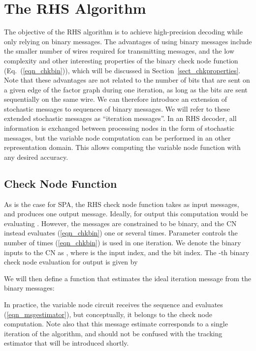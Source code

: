 \documentclass[12pt,journal,twoside,draftcls,onecolumn]{IEEEtran}
\begin{document}
\section{The RHS Algorithm}
\label{sect_algorithm}

The objective of the RHS algorithm is to achieve high-precision decoding while only relying on binary messages. The advantages of using binary messages include the smaller number of wires required for transmitting messages, and the low complexity and other interesting properties of the binary check node function (Eq.~(\ref{eqn_chkbin})), which will be discussed in Section~\ref{sect_chkproperties}.
Note that these advantages are not related to the number of bits that are sent on a given edge of the factor graph during one iteration, as long as the bits are sent sequentially on the same wire.
We can therefore introduce an extension of stochastic messages to sequences of binary messages. We will refer to these extended stochastic messages as ``iteration messages''.
In an RHS decoder, all information is exchanged between processing nodes in the form of stochastic messages, but the variable node computation can be performed in an other representation domain. This allows computing the variable node function with any desired accuracy. 


\subsection{Check Node Function}
\label{sect_CNComputation}

As is the case for SPA, the RHS check node function takes as input  messages, and produces one output message. 
Ideally, for output  this computation would be evaluating .
However, the messages are constrained to be binary, and the CN instead evaluates (\ref{eqn_chkbin}) one or several times. Parameter  controls the number of times (\ref{eqn_chkbin}) is used in one iteration.
We denote the binary inputs to the CN as , where  is the input index, and  the bit index. 
The -th binary check node evaluation for output  is given by

We will then define a function  that estimates the ideal iteration message  from the binary messages:

In practice, the variable node circuit receives the sequence  and evaluates (\ref{eqn_msgestimator}), but conceptually, it belongs to the check node computation.
Note also that this message estimate corresponds to a single iteration of the algorithm, and should not be confused with the tracking estimator that will be introduced shortly.
\end{document}
